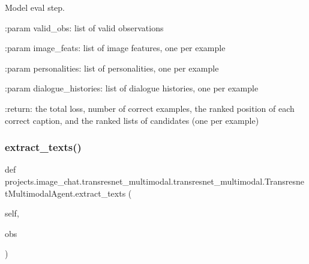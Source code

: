 \begin{DoxyVerb}Model eval step.

:param valid_obs:
    list of valid observations

:param image_feats:
    list of image features, one per example

:param personalities:
    list of personalities, one per example

:param dialogue_histories:
    list of dialogue histories, one per example

:return:
    the total loss, number of correct examples,
    the ranked position of each correct caption,
    and the ranked lists of candidates (one per example)
\end{DoxyVerb}
 \mbox{\label{classprojects_1_1image__chat_1_1transresnet__multimodal_1_1transresnet__multimodal_1_1TransresnetMultimodalAgent_ac6efbef147b54cd3e5129b86df095687}} 
\subsubsection{\texorpdfstring{extract\+\_\+texts()}{extract\_texts()}}
{\footnotesize\ttfamily def projects.\+image\+\_\+chat.\+transresnet\+\_\+multimodal.\+transresnet\+\_\+multimodal.\+Transresnet\+Multimodal\+Agent.\+extract\+\_\+texts (\begin{DoxyParamCaption}\item[{}]{self,  }\item[{}]{obs }\end{DoxyParamCaption})}

